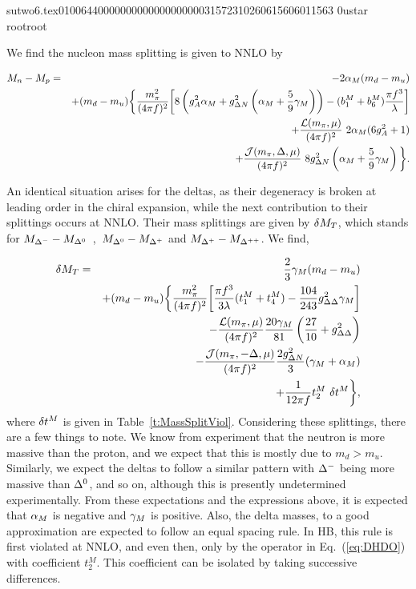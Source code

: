                                                                                                                                                                                                                                                                                       sutwo6.tex                                                                                          0100644 0000000 0000000 00000315723 10260615606 011563  0                                                                                                    ustar   root                            root                                                                                                                                                                                                                   \documentclass[prd,amssymb,amsmath,showpacs,nofootinbib,superscriptaddress]{revtex4}
\begin{document}
We find the nucleon mass splitting is given to NNLO by

\begin{eqnarray}\label{eq:NmassSplit}
  M_n - M_p &=& 
    - 2{\alpha}_M (m_d - m_u) \nonumber\\
  &&+ (m_d - m_u) \bigg\{ \frac{m_\pi^2}{(4\pi f)^2} \bigg[
        8\left( g_A^2 {\alpha}_M + g_{{\Delta} N}^2 \left( {\alpha}_M +\frac{5}{9}{\gamma}_M
         \right) \right)
        - (b^M_1 +b^M_6)\frac{\pi f^3}{{\lambda}} \bigg] \nonumber\\
  &&\qquad\qquad\qquad
     + \frac{{\mathcal L}(m_\pi,\mu)}{(4\pi f)^2}\ 2{\alpha}_M (6 g_A^2 +1)
     \nonumber\\
  &&\qquad\qquad\qquad
     + \frac{{\mathcal J} (m_\pi,{\Delta},\mu)}{(4\pi f)^2}\ 8 g_{{\Delta} N}^2
        \left( {\alpha}_M + \frac{5}{9} {\gamma}_M \right) \bigg\}.
\end{eqnarray}

An identical situation arises for the deltas, as their degeneracy
is broken at leading order in the chiral expansion, while the next
contribution to their splittings occurs at NNLO. Their mass
splittings are given by ${\delta} M_T$, which stands for $M_{{\Delta}^-}
-M_{{\Delta}^0}$\ ,\ $M_{{\Delta}^0} -M_{{\Delta}^+}$ and $M_{{\Delta}^+} -M_{{\Delta}^{++}}$.  We find,

\begin{eqnarray}\label{eq:DmassSplit}
  {\delta} M_T &=& \frac{2}{3}{\gamma}_M (m_d -m_u) \nonumber\\
  &&+ (m_d -m_u) \bigg\{ \frac{m_\pi^2}{(4\pi f)^2} \bigg[
        \frac{\pi f^3}{3 {\lambda}}(t^M_1 +t^M_4) 
        -\frac{104}{243} g_{{\Delta}{\Delta}}^2 {\gamma}_M \bigg] \nonumber\\
  &&\qquad\qquad\qquad
    - \frac{{\mathcal L}(m_\pi,\mu)}{(4\pi f)^2} \frac{20{\gamma}_M}{81} 
     \left( \frac{27}{10}+ g_{{\Delta}{\Delta}}^2 \right) \nonumber\\
  &&\qquad\qquad\qquad
    - \frac{{\mathcal J} (m_\pi,-{\Delta},\mu)}{(4\pi f)^2} \frac{2 g_{{\Delta} N}^2}{3} ({\gamma}_M
    +{\alpha}_M) \nonumber\\
  &&\qquad\qquad\qquad
    + \frac{1}{12 \pi f} t^M_2\ {\delta} t^M  \bigg\},
\end{eqnarray}
where ${\delta} t^M$ is given in Table~\ref{t:MassSplitViol}.  Considering
these splittings, there are a few things to note.  We know from
experiment that the neutron 
is more massive than the proton, and we expect that this is mostly due
to $m_d > m_u$.  Similarly, we expect the deltas to follow a
similar pattern with ${\Delta}^-$ being more massive than ${\Delta}^0$, and so on,
although this is presently undetermined experimentally.  From these
expectations and the expressions above, it is expected that ${\alpha}_M$ is
negative and ${\gamma}_M$ is positive.  Also, the delta masses, to a good
approximation are expected to follow an equal spacing rule.  In HB\CPT,
this rule is first violated at NNLO, and even then, only by the
operator in Eq.~(\ref{eq:DHDO}) with coefficient $t^M_2$.  This
coefficient can be isolated by taking successive differences.
\end{document}
